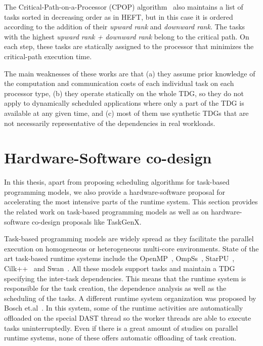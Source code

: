 The Critical-Path-on-a-Processor (CPOP) algorithm~\cite{HEFT} also maintains a list of tasks sorted in decreasing order as in HEFT, but in this case it is ordered according to the addition of their \textit{upward rank} and \textit{downward rank}. The tasks with the highest \textit{upward rank + downward rank} belong to the critical path. On each step, these tasks are statically assigned to the processor that minimizes the critical-path execution time.


The main weaknesses of these works are that (a) they assume prior knowledge of the computation and communication costs of each individual task on each processor type, (b) they operate statically on the whole TDG, so they do not apply to dynamically scheduled applications where only a part of the TDG is available at any given time, and (c) most of them use synthetic TDGs that are not necessarily representative of the dependencies in real workloads.




\section{Hardware-Software co-design}
\label{sec.related.taskgenx}


In this thesis, apart from proposing scheduling algorithms for task-based programming models, we also provide a hardware-software proposal for accelerating the most intensive parts of the runtime system.
This section provides the related work on task-based programming models as well as on hardware-software co-design proposals like TaskGenX.

Task-based programming models are widely spread as they facilitate the parallel execution on homogeneous or heterogeneous multi-core environments.
State of the art task-based runtime systems include the OpenMP~\cite{OpenMP}, OmpSs~\cite{OmpSs_PPL11}, StarPU~\cite{starpu}, Cilk++~\cite{Cilk,Cilk++} and Swan~\cite{Vandierendonck:PACT2011}.
All these models support tasks and maintain a TDG specifying the inter-task dependencies.
This means that the runtime system is responsible for the task creation, the dependence analysis as well as the scheduling of the tasks.
A different runtime system organization was proposed by Bosch et.al~\cite{DAST,JaumeMaster}.
In this system, some of the runtime activities are automatically offloaded on the special DAST thread so the worker threads are able to execute tasks uninterruptedly.  
Even if there is a great amount of studies on parallel runtime systems, none of these offers automatic offloading of task creation.

